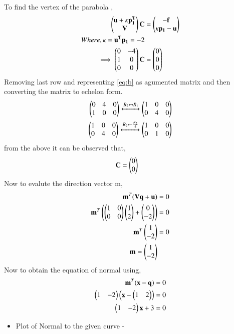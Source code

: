 \documentclass[journal,12pt,twocolumn]{IEEEtran}
\begin{document}
To find the vertex of the parabola ,
\begin{align} \begin{pmatrix}\mathbf{u}+\kappa\mathbf{p_1^T}\\\mathbf{V} \end{pmatrix}\mathbf{C} &= \begin{pmatrix}\mathbf{-f}\\\kappa \mathbf{p_1} -\mathbf{u}\end{pmatrix}
\\
 Where, \kappa = \mathbf{u^T}\mathbf{p_1} = -2
\\
\implies\begin{pmatrix}0 & -4\\1 & 0 \\0 & 0\end{pmatrix} \mathbf{C}&= \begin{pmatrix}0\\0\\0\end{pmatrix} \label{eq:b}
\end{align}
Removing last row and representing \eqref{eq:b} as agumented matrix and then converting the matrix to echelon form.
\begin{align}
\begin{pmatrix}0 & 4 & 0 \\ 1 & 0 & 0\end{pmatrix}\xleftrightarrow{R_2 \leftrightarrow R_1}\begin{pmatrix}1 & 0 & 0 \\ 0 & 4 & 0\end{pmatrix} 
\\
\begin{pmatrix}1 & 0 & 0 \\ 0 & 4 & 0\end{pmatrix}\xleftrightarrow{R_2 \leftarrow\frac{R_2}{4}}\begin{pmatrix}1 & 0 & 0\\ 0 & 1 & 0\end{pmatrix}
\end{align}
from the above it can be observed that,
\begin{align}    
   \mathbf{C} &= \begin{pmatrix}0 \\ 0\end{pmatrix}
\end{align}
Now to evalute the direction vector m,
\begin{align}
\mathbf{m}^T(\mathbf{V}\mathbf{q} + \mathbf{u}) &=0
\\
\mathbf{m}^T\left(\begin{pmatrix}1 & 0 \\ 0 & 0\end{pmatrix}\begin{pmatrix}1 \\ 2\end{pmatrix} + \begin{pmatrix}0 \\ -2\end{pmatrix}\right) &=0
\\
\mathbf{m}^T\begin{pmatrix}1 \\ -2\end{pmatrix} &=0
\\
\mathbf{m} = \begin{pmatrix}1 \\ -2\end{pmatrix}
\end{align}
Now to obtain the equation of normal using,
\begin{align}
\mathbf{m}^T(\mathbf{x} - \mathbf{q}) &=0 
\\
\begin{pmatrix}1 & -2\end{pmatrix}\left(\mathbf{x}-\begin{pmatrix}1 & 2\end{pmatrix}\right) &= 0
\\
\begin{pmatrix}1 & -2\end{pmatrix}\mathbf{x}+ 3 &= 0 
\end{align}
\begin{itemize}
\item Plot of Normal to the given curve -
\end{itemize}
\end{document}
